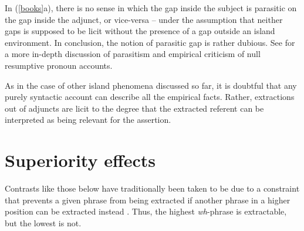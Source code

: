 \documentclass[output=paper
 	        ,biblatex
                ,babelshorthands
                ,newtxmath
                ,draftmode
                ,colorlinks, citecolor=brown
]{langscibook}
\begin{document}
\eal  \label{books}
\zl

\noindent
In (\ref{books}a), there is no sense in which the gap inside the subject is parasitic on the gap
inside the adjunct, or vice-versa -- under the assumption that neither gaps is supposed to be licit
without the presence of a gap outside an island environment. In conclusion, the notion of parasitic
gap is rather dubious. See \citet[256--273]{levhubook} for a more in-depth discussion of parasitism and
empirical criticism of null resumptive pronoun accounts.

As in the case of other island phenomena discussed so far, it is doubtful that any purely syntactic
account can describe all the empirical facts.  Rather, extractions out of adjuncts are licit to the
degree that the extracted referent can be interpreted as being relevant for the assertion.




\section{Superiority effects}

Contrasts like those below have traditionally been taken to be due to a constraint that prevents a
given phrase from being extracted if another phrase in a higher position can be extracted instead
\citep{chomsky73,chomsky80}. Thus, the highest \emph{wh}-phrase is extractable, but the lowest is
not.

\eal  \label{badsc1}
\zl
\end{document}

